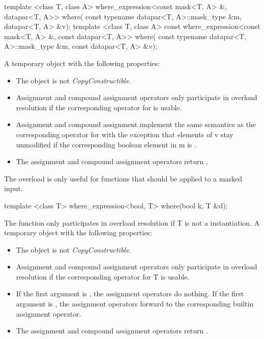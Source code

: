 \begin{itemdecl}
template <class T, class A>
where_expression<const mask<T, A> &, datapar<T, A>> where(
    const typename datapar<T, A>::mask_type &m, datapar<T, A> &v);
template <class T, class A>
const where_expression<const mask<T, A> &, const datapar<T, A>> where(
    const typename datapar<T, A>::mask_type &m, const datapar<T, A> &v);
\end{itemdecl}
\begin{itemdescr}
  \pnum\returns A temporary object with the following properties:
  \begin{itemize}
    \item The object is not \textit{CopyConstructible}.
    \item Assignment and compound assignment operators only participate in overload resolution if the corresponding operator for \datapar[<T, A>] is usable.
    \item \effects Assignment and compound assignment implement the same semantics as the corresponding operator for \datapar[<T, A>] with the exception that elements of \code v stay unmodified if the corresponding boolean element in \code m is \false.
    \item The assignment and compound assignment operators return \void.
  \end{itemize}
  \pnum\realnote The \const overload is only useful for functions that should be applied to a masked \datapar input.
\end{itemdescr}

\begin{itemdecl}
template <class T> where_expression<bool, T> where(bool k, T &d);
\end{itemdecl}
\begin{itemdescr}
  \pnum\remarks The function only participates in overload resolution if \type T is not a \datapar instantiation.
  \pnum\returns A temporary object with the following properties:
  \begin{itemize}
    \item The object is not \textit{CopyConstructible}.
    \item Assignment and compound assignment operators only participate in overload resolution if the corresponding operator for \type T is usable.
    \item \effects If the first argument is \false, the assignment operators do nothing.
      If the first argument is \true, the assignment operators forward to the corresponding builtin assignment operator.
    \item The assignment and compound assignment operators return \void.
  \end{itemize}
\end{itemdescr}

